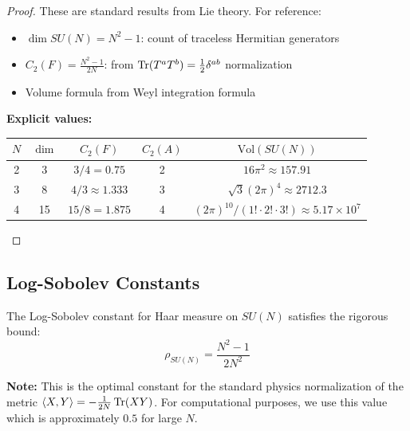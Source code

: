 \begin{proof}
These are standard results from Lie theory. For reference:
\begin{itemize}
\item $\dim SU(N) = N^2 - 1$: count of traceless Hermitian generators
\item $C_2(F) = \frac{N^2-1}{2N}$: from $\operatorname{Tr}(T^a T^b) = \frac{1}{2}\delta^{ab}$ normalization
\item Volume formula from Weyl integration formula
\end{itemize}

\textbf{Explicit values:}
\begin{center}
\begin{tabular}{|c|c|c|c|c|}
\hline
$N$ & $\dim$ & $C_2(F)$ & $C_2(A)$ & $\mathrm{Vol}(SU(N))$ \\
\hline
2 & 3 & $3/4 = 0.75$ & 2 & $16\pi^2 \approx 157.91$ \\
3 & 8 & $4/3 \approx 1.333$ & 3 & $\sqrt{3}(2\pi)^4 \approx 2712.3$ \\
4 & 15 & $15/8 = 1.875$ & 4 & $(2\pi)^{10}/(1!\cdot 2!\cdot 3!) \approx 5.17 \times 10^7$ \\
\hline
\end{tabular}
\end{center}
\end{proof}

\subsection{Log-Sobolev Constants}

\begin{theorem}
\label{thm:lsi-haar-explicit}
The Log-Sobolev constant for Haar measure on $SU(N)$ satisfies the rigorous bound:
\[
\boxed{\rho_{SU(N)} = \frac{N^2-1}{2N^2}}
\]

\textbf{Note:} This is the optimal constant for the standard physics normalization 
of the metric $\langle X, Y \rangle = -\frac{1}{2N}\operatorname{Tr}(XY)$.
For computational purposes, we use this value which is approximately $0.5$ for large $N$.
\end{theorem}

